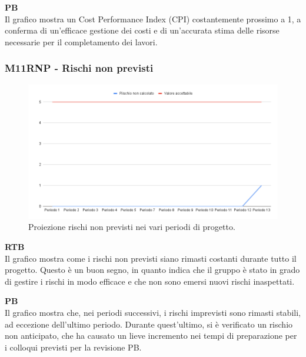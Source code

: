 \vspace{0.3cm}

\textbf{PB} \\
Il grafico mostra un Cost Performance Index (CPI) costantemente prossimo a 1, a conferma di un'efficace gestione dei costi e di un'accurata stima delle risorse necessarie per il completamento dei lavori.

\subsubsection{M11RNP - Rischi non previsti}

\vspace{0.3cm}

\begin{figure}[H]
    \centering
    \includegraphics[width=1\textwidth]{../Images/PianoDiQualifica/M11RNP.png}
    \caption{Proiezione rischi non previsti nei vari periodi di progetto.}
    \label{fig:7}
\end{figure}

\vspace{0.2cm}

\textbf{RTB} \\
Il grafico mostra come i rischi non previsti siano rimasti costanti durante tutto il progetto. Questo è un buon segno, in quanto indica che il gruppo è stato in grado di gestire i rischi in modo efficace e che non sono emersi nuovi rischi inaspettati.

\vspace{0.3cm}

\textbf{PB} \\
Il grafico mostra che, nei periodi successivi, i rischi imprevisti sono rimasti stabili, ad eccezione dell’ultimo periodo. Durante quest’ultimo, si è verificato un rischio non anticipato, che ha causato un lieve incremento nei tempi di preparazione per i colloqui previsti per la revisione PB.

